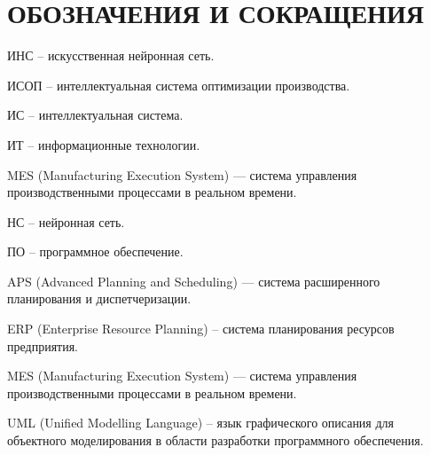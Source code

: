 \section*{ОБОЗНАЧЕНИЯ И СОКРАЩЕНИЯ}

ИНС -- искусственная нейронная сеть.

ИСОП -- интеллектуальная система оптимизации производства.

ИС -- интеллектуальная система.

ИТ -- информационные технологии.

MES (Manufacturing Execution System) — система управления производственными процессами в реальном времени.

НС -- нейронная сеть.

ПО -- программное обеспечение.

APS (Advanced Planning and Scheduling) — система расширенного планирования и диспетчеризации.

ERP (Enterprise Resource Planning) -- система планирования ресурсов предприятия.

MES (Manufacturing Execution System) — система управления производственными процессами в реальном времени.

UML (Unified Modelling Language) -- язык графического описания для объектного моделирования в области разработки программного обеспечения.

